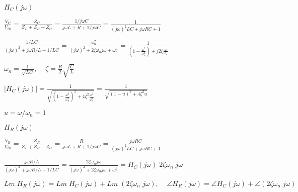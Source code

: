 \documentclass{article}
\def\lthtmlcheckvsize{\ifdim\ht\sizebox<\vsize 
  \ifdim\wd\sizebox<\hsize\expandafter\hfill\fi \expandafter\vfill
  \else\expandafter\vss\fi}%
\begin{document}
{\newpage\clearpage
{}%
$\displaystyle H_C(j\omega)$%
\lthtmlindisplaymathZ
\lthtmlcheckvsize\clearpage}

{\newpage\clearpage
{}%
$\displaystyle \frac{V_C}{V_{in}}=\frac{Z_C}{Z_L+Z_R+Z_C}
=\frac{1/j\omega C}{j\omega L+R+1/j\omega C}
=\frac{1}{(j\omega)^2 LC+j\omega RC+1}$%
\lthtmlindisplaymathZ
\lthtmlcheckvsize\clearpage}

{\newpage\clearpage
{}%
$\displaystyle \frac{1/LC}{(j\omega)^2 +j\omega R/L+1/LC}
=\frac{\omega_n^2}{(j\omega)^2 +2\zeta\omega_n j\omega+\omega^2_n}
=\frac{1}{(1-\frac{\omega^2}{\omega_n^2})+j2\zeta\frac{\omega}{\omega_n}}$%
\lthtmlindisplaymathZ
\lthtmlcheckvsize\clearpage}

{\newpage\clearpage
{}%
$\displaystyle \omega_n=\frac{1}{\sqrt{LC}},\;\;\;\;\zeta=\frac{R}{2}\sqrt{\frac{C}{L}} $%
\lthtmlindisplaymathZ
\lthtmlcheckvsize\clearpage}

{\newpage\clearpage
{}%
$\displaystyle |H_C(j\omega)|
  =\frac{1}{\sqrt{(1-\frac{\omega^2}{\omega_n^2})^2+4\zeta^2 \frac{\omega^2}{\omega_n^2}}}
  =\frac{1}{\sqrt{(1-u)^2+4\zeta^2 u}} $%
\lthtmlindisplaymathZ
\lthtmlcheckvsize\clearpage}

{\newpage\clearpage
{}%
$u=\omega/\omega_n=1$%
\lthtmlindisplaymathZ
\lthtmlcheckvsize\clearpage}

{\newpage\clearpage
{}%
$\displaystyle H_R(j\omega)$%
\lthtmlindisplaymathZ
\lthtmlcheckvsize\clearpage}

{\newpage\clearpage
{}%
$\displaystyle \frac{V_R}{V_{in}}=\frac{Z_R}{Z_L+Z_R+Z_C}
=\frac{R}{j\omega L+R+1/j\omega C}
=\frac{j\omega RC}{(j\omega)^2 LC+j\omega RC+1}$%
\lthtmlindisplaymathZ
\lthtmlcheckvsize\clearpage}

{\newpage\clearpage
{}%
$\displaystyle \frac{j\omega R/L}{(j\omega)^2 +j\omega R/L+1/LC}
=\frac{2\zeta\omega_nj\omega}{(j\omega)^2 +2\zeta\omega_n j\omega+\omega^2_n}
=H_C(j\omega) \;2\zeta \omega_n\;j \omega$%
\lthtmlindisplaymathZ
\lthtmlcheckvsize\clearpage}

{\newpage\clearpage
{}%
$\displaystyle Lm\;H_R(j\omega)=Lm\; H_C(j\omega)+Lm\;(2\zeta\omega_n\;j\omega),\;\;\;\;
  \angle H_R(j\omega)=\angle H_C(j\omega)+\angle(2\zeta\omega_n\;j\omega) $%
\lthtmlindisplaymathZ
\lthtmlcheckvsize\clearpage}
\end{document}
